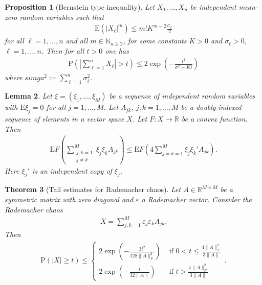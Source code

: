 \documentclass[13pt]{article}
\newtheorem{thm}{Theorem}[section]
\newtheorem{lem}[thm]{Lemma}
\newtheorem{prop}[thm]{Proposition}
\theoremstyle{plain}
\newcommand{\R}{\mathbb{R}}
\newcommand{\N}{\mathbb{N}}
\newcommand{\E}{\bm{\mathrm{E}}}
\renewcommand{\P}{\bm{\mathrm{P}}}
\begin{document}
\begin{prop}[Bernstein type inequality]
    Let $X_1, \ldots, X_n$ be independent mean-zero random variables
    such that
    \[
        \begin{aligned}
            \E\left( |X_\ell|^m  \right) \le m! K^{m-2} \frac{\sigma_\ell}{2}
        \end{aligned}
    \] for all $\ell = 1, \ldots, n$ and all $m \in \N_{n \ge 2}$,
    for some constants $K > 0$ and $\sigma_\ell > 0$, $\ell = 1, \ldots, n$.
    Then for all $t > 0$ one has
    \[
        \begin{aligned}
            \P\left( \left|\sum_{\ell=1}^{n} X_\ell\right| > t \right)
            \le 2 \exp(-\frac{t^2}{\sigma^2 + Kt})
        \end{aligned}
    \]
    where $simga^2 := \sum_{\ell=1}^{n} \sigma_\ell^2$.
\end{prop}

\begin{lem}
    Let $\xi = (\xi_1, \ldots, \xi_M)$ be a sequence of independent random variables with $\E \xi_j = 0$ for all $j = 1, \ldots, M$. Let $A_{jk}$, $j, k = 1, \ldots, M$ be a doubly indexed sequence of elements in a vector space $X$. Let $F: X \to \R$ be a convex function.
    Then
    \[
        \begin{aligned}
            \E F\left( \sum_{\substack{j,k = 1\\ j \ne k}}^{M} \xi_j\xi_kA_{jk} \right) \le \E F\left( 4 \sum_{j=k=1}^{M} \xi_j\xi_k'A_{jk} \right).
        \end{aligned}
    \]
    Here $\xi_j'$ is an independent copy of $\xi_j$.
\end{lem} 

\begin{thm}[Tail estimates for Rademacher chaos]
    Let $A \in \R^{M \times M}$ be a symmetric matrix with zero
    diagonal and $\varepsilon$ a Rademacher vector.
    Consider the Rademacher chaos
    \[
        \begin{aligned}
            X = \sum_{j,k = 1}^{M} \varepsilon_j\varepsilon_k A_{jk}.
        \end{aligned}
    \]
    Then
    \[
        \begin{aligned}
            \P\left( |X| \ge t \right) \le \begin{cases}
                2 \exp\left( - \frac{3t^2}{128\|A\|_F^2} \right) & \text{ if } 0 < t \le \frac{4 \|A\|_F^2}{3\|A\|} \\
                2 \exp\left( - \frac{t}{32\|A\|} \right) & \text{ if } t > \frac{4\|A\|_F^2}{3\|A\|}
            \end{cases} 
            .
        \end{aligned}
    \]
\end{thm}
\end{document}

